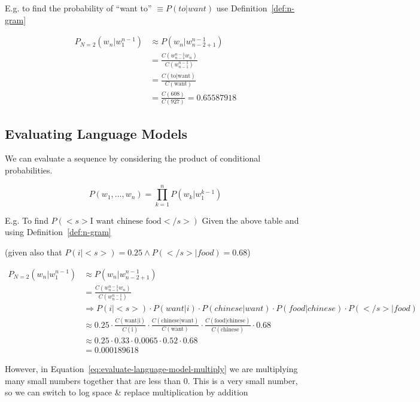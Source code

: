 \documentclass[11pt]{article}
\begin{document}
E.g. to find the probability of ``want to'' $\equiv P(to|want)$ use Definition~\ref{def:n-gram}
    
\begin{align*}
    P_{N=2}(w_n|w_1^{n-1}) & \approx P(w_n|w_{n-2+1}^{n-1}) \\
    & = \frac{C(w_{n-1}^{n-1}w_n)}{C(w_{n-1}^{n-1})} \\
    & = \frac{C(\text{to}|\text{want})}{C(\text{want})} \\
    & = \frac{C(\text{608})}{C(\text{927})} = 0.65587918
\end{align*}

\subsection{Evaluating Language Models}

We can evaluate a sequence by considering the product of conditional probabilities.

\begin{equation}\label{eq:evaluate-language-model-multiply}
    P(w_1, \ldots, w_n) = \prod^n_{k=1}P(w_k|w_1^{k-1})
\end{equation}

E.g. To find $P(<s>\text{I want chinese food}</s>)$ Given the above table and using Definition~\ref{def:n-gram}

(given also that $P(i|<s>) = 0.25 \wedge P(</s>|food) = 0.68$) 

\begin{align*}
    P_{N=2}(w_n|w_1^{n-1}) & \approx P(w_n|w_{n-2+1}^{n-1}) \\
    & = \frac{C(w_{n-1}^{n-1}w_n)}{C(w_{n-1}^{n-1})} \\
    & \Rightarrow P(i|<s>) \cdot P(want|i) \cdot P(chinese|want) \cdot P(food|chinese) \cdot P(</s>|food) \\
    & \approx 0.25 \cdot \frac{C(\text{want}|\text{i})}{C(\text{i})} \cdot \frac{C(\text{chinese}|\text{want})}{C(\text{want})} \cdot \frac{C(\text{food}|\text{chinese})}{C(\text{chinese})} \cdot 0.68 \\
    & \approx 0.25 \cdot 0.33 \cdot 0.0065 \cdot 0.52 \cdot 0.68 \\
    & = 0.000189618
\end{align*}

However, in Equation~\ref{eq:evaluate-language-model-multiply} we are multiplying many small numbers together that are less than 0. This is a very small number, so we can switch to log space \& replace multiplication by addition
\end{document}
